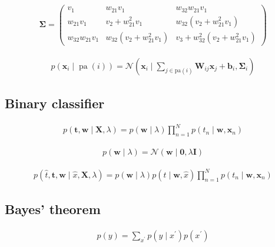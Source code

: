 \documentclass{article}
\begin{document}
\begin{align*}
\boldsymbol{\Sigma}=\left(\begin{array}{ccc}
v_{1} & w_{21} v_{1} & w_{32} w_{21} v_{1} \\
w_{21} v_{1} & v_{2}+w_{21}^{2} v_{1} & w_{32}\left(v_{2}+w_{21}^{2} v_{1}\right) \\
w_{32} w_{21} v_{1} & w_{32}\left(v_{2}+w_{21}^{2} v_{1}\right) & v_{3}+w_{32}^{2}\left(v_{2}+w_{21}^{2} v_{1}\right)
\end{array}
\right)
\tag{11.16}
\end{align*}

\begin{align*}
p\left(\mathbf{x}_{i} \mid \operatorname{pa}(i)\right)=\mathcal{N}\left(\mathbf{x}_{i} \mid \sum_{j \in \mathrm{pa}(i)} \mathbf{W}_{i j} \mathbf{x}_{j}+\mathbf{b}_{i}, \boldsymbol{\Sigma}_{i}\right)
\tag{11.17}
\end{align*}

\subsection{Binary classifier}

\begin{align*}
p(\mathbf{t}, \mathbf{w} \mid \mathbf{X}, \lambda)=p(\mathbf{w} \mid \lambda) \prod_{n=1}^{N} p\left(t_{n} \mid \mathbf{w}, \mathbf{x}_{n}\right)
\tag{11.18}
\end{align*}

\begin{align*}
p(\mathbf{w} \mid \lambda)=\mathcal{N}(\mathbf{w} \mid \mathbf{0}, \lambda \mathbf{I})
\tag{11.19}
\end{align*}

\begin{align*}
p(\widehat{t}, \mathbf{t}, \mathbf{w} \mid \widehat{x}, \mathbf{X}, \lambda)=p(\mathbf{w} \mid \lambda) p(\widehat{t} \mid \mathbf{w}, \widehat{x}) \prod_{n=1}^{N} p\left(t_{n} \mid \mathbf{w}, \mathbf{x}_{n}\right)
\tag{11.20}
\end{align*}

\subsection{Bayes' theorem}

\begin{align*}
p(y)=\sum_{x^{\prime}} p\left(y \mid x^{\prime}\right) p\left(x^{\prime}\right) 
\tag{11.21}
\end{align*}
\end{document}

